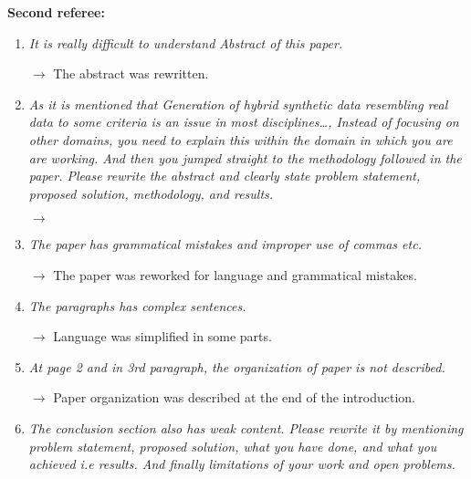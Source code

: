 \documentclass[11pt,a4paper,sans]{moderncv}        %
\begin{document}
\bigskip
\bigskip

\textbf{Second referee:}




 
\begin{enumerate}
	\item \textit{It is really difficult to understand Abstract of this paper.}
	
	$\rightarrow$ The abstract was rewritten.
	
	\medskip
 
    \item \textit{As it is mentioned that Generation of hybrid synthetic data resembling real data to some criteria is an issue in most disciplines\ldots , Instead of focusing on other domains, you need to explain this within the domain in which you are are working. And then you jumped straight to the methodology followed in the paper. Please rewrite the abstract and clearly state problem statement,  proposed solution, methodology, and results.}
    
    $\rightarrow$
    
    \medskip
    
    \item \textit{The paper has grammatical mistakes and improper use of commas etc.}
    
    $\rightarrow$ The paper was reworked for language and grammatical mistakes.
    
	\medskip
    
    \item \textit{The paragraphs has complex sentences.}
    
    $\rightarrow$ Language was simplified in some parts.
    
    \medskip
    
    \item \textit{At page 2 and in 3rd paragraph, the organization of paper is not described.}
    
    $\rightarrow$ Paper organization was described at the end of the introduction.
    
    \medskip
    
    \item \textit{The conclusion section also has weak content. Please rewrite it by mentioning problem statement, proposed solution, what you have done, and what you achieved i.e results. And finally limitations of your work and open problems.}
    

\end{enumerate}
\end{document}
